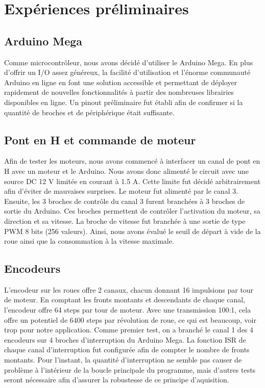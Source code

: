\chapter{Expériences préliminaires}

\section{Arduino Mega}

Comme microcontrôleur, nous avons décidé d'utiliser le Arduino Mega. En plus d'offrir un I/O assez généreux, la facilité d'utilisation et l'énorme communauté Arduino en ligne
en font une solution accessible et permettant de déployer rapidement de nouvelles fonctionnalités à partir des nombreuses librairies disponibles en ligne. Un pinout préliminaire fut
établi afin de confirmer si la quantité de broches et de périphérique était suffisante.

\section{Pont en H et commande de moteur}

Afin de tester les moteurs, nous avons commencé à interfacer un canal de pont en H avec un moteur et le Arduino. Nous avons donc alimenté le circuit avec une source DC 12 V
limitée en courant à 1.5 A. Cette limite fut décidé arbitrairement afin d'éviter de mauvaises surprises. Le moteur fut alimenté par le canal 3. Ensuite, les 3 broches de
contrôle du canal 3 furent branchées à 3 broches de sortie du Arduino. Ces broches permettent de contrôler l'activation du moteur, sa direction et sa vitesse.
La broche de vitesse fut branchée à une sortie de type PWM 8 bits (256 valeurs). Ainsi, nous avons évalué le seuil de départ à vide de la roue ainsi que la consommation à la vitesse maximale.

\section{Encodeurs}

L'encodeur sur les roues offre 2 canaux, chacun donnant 16 impulsions par tour de moteur. En comptant les fronts montants et descendants de chaque canal,
l'encodeur offre 64 steps par tour de moteur. Avec une transmission 100:1, cela offre un potentiel de 6400 steps par révolution de roue, ce qui est beaucoup,
voir trop pour notre application.  Comme premier test, on a branché le canal 1 des 4 encodeurs sur 4 broches d'interruption du Arduino Mega. La fonction ISR de
chaque canal d'interruption fut configurée afin de compter le nombre de fronts montants. Pour l'instant, la quantité d'interruption ne semble pas causer de problème
à l'intérieur de la boucle principale du programme, mais d'autres tests seront nécessaire afin d'assurer la robustesse de ce principe d'aquisition.


